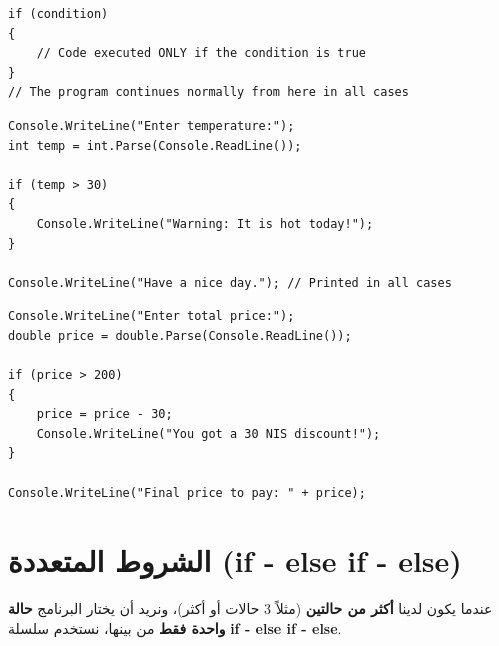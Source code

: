 \documentclass[14pt]{extarticle}
\begin{document}
\begin{boxCode}
\begin{english}
\begin{verbatim}
if (condition)
{
    // Code executed ONLY if the condition is true
}
// The program continues normally from here in all cases
\end{verbatim}
\end{english}
\end{boxCode}

\begin{boxExample}
\begin{english}
\begin{verbatim}
Console.WriteLine("Enter temperature:");
int temp = int.Parse(Console.ReadLine());

if (temp > 30)
{
    Console.WriteLine("Warning: It is hot today!");
}

Console.WriteLine("Have a nice day."); // Printed in all cases
\end{verbatim}
\end{english}
\end{boxExample}

\begin{boxExample}
\begin{english}
\begin{verbatim}
Console.WriteLine("Enter total price:");
double price = double.Parse(Console.ReadLine());

if (price > 200)
{
    price = price - 30;
    Console.WriteLine("You got a 30 NIS discount!");
}

Console.WriteLine("Final price to pay: " + price);
\end{verbatim}
\end{english}
\end{boxExample}

\clearpage
\section{الشروط المتعددة (\textenglish{if - else if - else})}

عندما يكون لدينا \textbf{أكثر من حالتين} (مثلاً 3 حالات أو أكثر)، ونريد أن يختار البرنامج \textbf{حالة واحدة فقط} من بينها، نستخدم سلسلة \textbf{\textenglish{if - else if - else}}.
\end{document}
